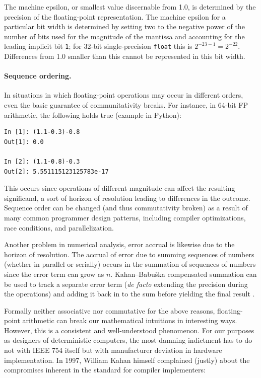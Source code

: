 \documentclass[twoside]{article}
\begin{document}
The machine epsilon, or smallest value discernable from 1.0, is determined by the precision of the floating-point representation.  The machine epsilon for a particular bit width is determined by setting two to the negative power of the number of bits used for the magnitude of the mantissa and accounting for the leading implicit bit \texttt{1}; for 32-bit single-precision \texttt{float} this is $2^{-{23-1}} = 2^{-22}$.  Differences from 1.0 smaller than this cannot be represented in this bit width.

\paragraph{Sequence ordering.}

In situations in which floating-point operations may occur in different orders, even the basic guarantee of communitativity breaks.  For instance, in 64-bit FP arithmetic, the following holds true (example in Python):

\lstset{language=Python}
\begin{lstlisting}[style=listingcode_python]
In [1]: (1.1-0.3)-0.8
Out[1]: 0.0

In [2]: (1.1-0.8)-0.3
Out[2]: 5.551115123125783e-17
\end{lstlisting}

\noindent
This occurs since operations of different magnitude can affect the resulting significand, a sort of horizon of resolution leading to differences in the outcome.  Sequence order can be changed (and thus commutativity broken) as a result of many common programmer design patterns, including compiler optimizations, race conditions, and parallelization.

Another problem in numerical analysis, error accrual is likewise due to the horizon of resolution.  The accrual of error due to summing sequences of numbers (whether in parallel or serially) occurs in the summation of sequences of numbers since the error term can grow as $n$.  Kahan–Babuška compensated summation can be used to track a separate error term (\emph{de facto} extending the precision during the operations) and adding it back in to the sum before yielding the final result \citep{Kahan1965,Babuska1969}.

Formally neither associative nor commutative for the above reasons, floating-point arithmetic can break our mathematical intuitions in interesting ways.  However, this is a consistent and well-understood phenomenon.  For our purposes as designers of deterministic computers, the most damning indictment has to do not with IEEE 754 itself but with manufacturer deviation in hardware implementation.  In 1997, William Kahan himself complained (justly) about the compromises inherent in the standard for compiler implementers:
\end{document}
